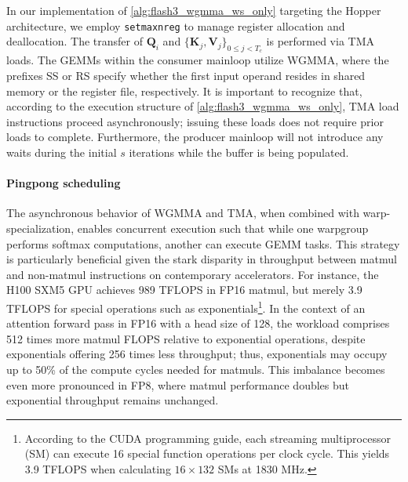 In our implementation of \cref{alg:flash3_wgmma_ws_only} targeting the Hopper architecture, we employ \verb|setmaxnreg| to manage register allocation and deallocation. The transfer of $\mathbf{Q}_i$ and $\{ \mathbf{K}_j, \mathbf{V}_j \}_{0 \leq j < T_c}$ is performed via TMA loads. The GEMMs within the consumer mainloop utilize WGMMA, where the prefixes SS or RS specify whether the first input operand resides in shared memory or the register file, respectively. It is important to recognize that, according to the execution structure of \cref{alg:flash3_wgmma_ws_only}, TMA load instructions proceed asynchronously; issuing these loads does not require prior loads to complete. Furthermore, the producer mainloop will not introduce any waits during the initial $s$ iterations while the buffer is being populated.

\paragraph{Pingpong scheduling} The asynchronous behavior of WGMMA and TMA, when combined with warp-specialization, enables concurrent execution such that while one warpgroup performs softmax computations, another can execute GEMM tasks. This strategy is particularly beneficial given the stark disparity in throughput between matmul and non-matmul instructions on contemporary accelerators. For instance, the H100 SXM5 GPU achieves 989 TFLOPS in FP16 matmul, but merely 3.9 TFLOPS for special operations such as exponentials\footnote{According to the CUDA programming guide, each streaming multiprocessor (SM) can execute 16 special function operations per clock cycle. This yields 3.9 TFLOPS when calculating $16 \times 132$ SMs at 1830 MHz.}. In the context of an attention forward pass in FP16 with a head size of 128, the workload comprises 512 times more matmul FLOPS relative to exponential operations, despite exponentials offering 256 times less throughput; thus, exponentials may occupy up to 50\% of the compute cycles needed for matmuls. This imbalance becomes even more pronounced in FP8, where matmul performance doubles but exponential throughput remains unchanged.

